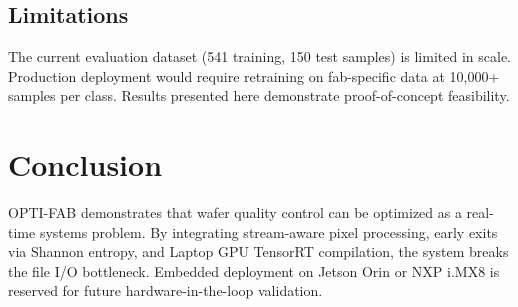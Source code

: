\documentclass[conference]{IEEEtran}
\begin{document}
\subsection{Limitations}
The current evaluation dataset (541 training, 150 test samples) is limited in scale. Production deployment would require retraining on fab-specific data at 10,000+ samples per class. Results presented here demonstrate proof-of-concept feasibility.

\section{Conclusion}
OPTI-FAB demonstrates that wafer quality control can be optimized as a real-time systems problem. By integrating stream-aware pixel processing, early exits via Shannon entropy, and Laptop GPU TensorRT compilation, the system breaks the file I/O bottleneck. Embedded deployment on Jetson Orin or NXP i.MX8 is reserved for future hardware-in-the-loop validation.



\end{document}
